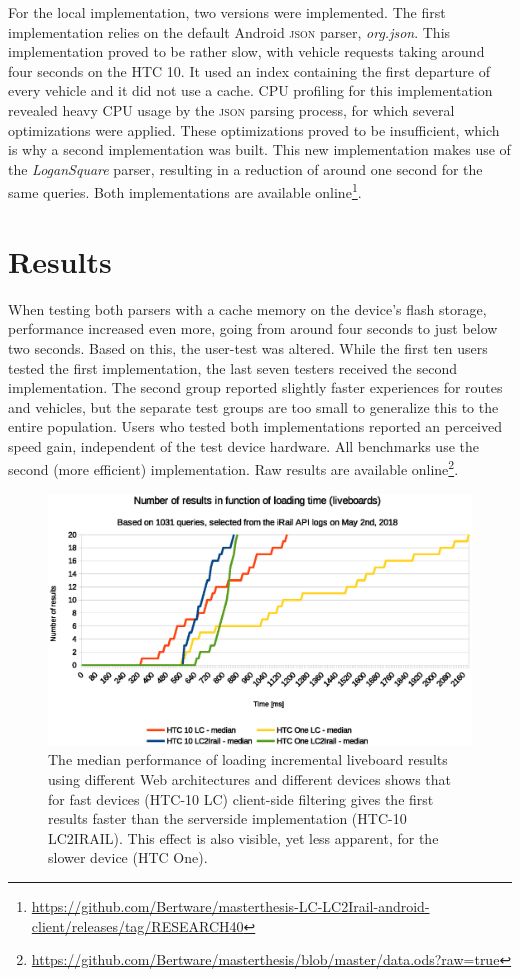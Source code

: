 \documentclass[twocolumn]{phdsymp} %
\begin{document}
For the local implementation, two versions were implemented. The first implementation relies on the default Android \textsc{json} parser, \emph{org.json}. This implementation proved to be rather slow, with vehicle requests taking around four seconds on the HTC 10. It used an index containing the first departure of every vehicle and it did not use a cache. CPU profiling for this implementation revealed heavy CPU usage by the \textsc{json} parsing process, for which several optimizations were applied. These optimizations proved to be insufficient, which is why a second implementation was built. This new implementation makes use of the \emph{LoganSquare} parser, resulting in a reduction of around one second for the same queries. Both implementations are available online\footnote{\url{https://github.com/Bertware/masterthesis-LC-LC2Irail-android-client/releases/tag/RESEARCH40}}.

\section{Results}

When testing both parsers with a cache memory on the device’s flash storage, performance increased even more, going from around four seconds to just below two seconds. Based on this, the user-test was altered. While the first ten users tested the first implementation, the last seven testers received the second implementation. The second group reported slightly faster experiences for routes and vehicles, but the separate test groups are too small to generalize this to the entire population. Users who tested both implementations reported an perceived speed gain, independent of the test device hardware. All benchmarks use the second (more efficient) implementation. Raw results are available online\footnote{\url{https://github.com/Bertware/masterthesis/blob/master/data.ods?raw=true}}.


\begin{figure}[ht]
	\begin{center}
		\includegraphics[width=.50\textwidth]{images/dief_liveboards_average.eps}
		\caption{\label{fig:liveboard} The median performance of loading incremental liveboard results using different Web architectures and different devices shows that for fast devices (HTC-10 LC) client-side filtering gives the first results faster than the serverside implementation (HTC-10 LC2IRAIL). This effect is also visible, yet less apparent, for the slower device (HTC One).}
	\end{center}
\end{figure}
\end{document}
